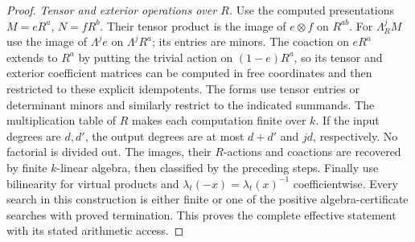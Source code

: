 \begin{proof}
\emph{Tensor and exterior operations over $R$.}
Use the computed presentations $M=eR^a$, $N=fR^b$.
Their tensor product is the image of $e\otimes f$
on $R^{ab}$. For $\Lambda^j_RM$ use the image of
$\Lambda^je$ on $\Lambda^jR^a$; its entries are minors.
The coaction on $eR^a$ extends to $R^a$ by putting the
trivial action on $(1-e)R^a$, so its tensor and exterior
coefficient matrices can be computed in free coordinates
and then restricted to these explicit idempotents.
The forms use tensor entries or determinant minors
and similarly restrict to the indicated summands.
The multiplication table of $R$ makes each computation
finite over $k$. If the input degrees are $d,d'$, the output degrees are
at most $d+d'$ and $jd$, respectively. No factorial is divided out.
The images, their $R$-actions and coactions are recovered
by finite $k$-linear algebra, then classified by the
preceding steps.
Finally use bilinearity for virtual products and
$\lambda_t(-x)=\lambda_t(x)^{-1}$ coefficientwise.
Every search in this construction is either finite or
one of the positive algebra-certificate searches with
proved termination. This proves the complete effective
statement with its stated arithmetic access.
\end{proof}

